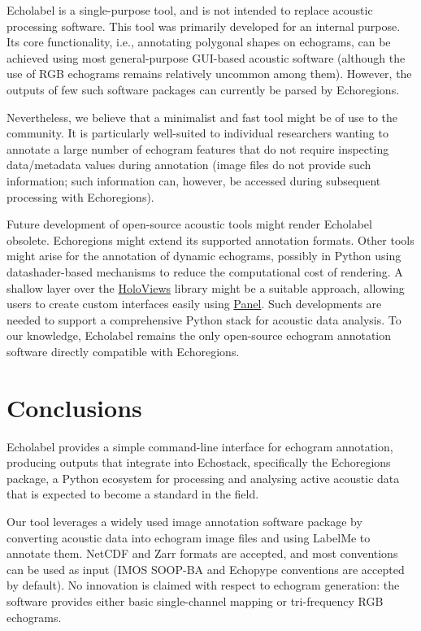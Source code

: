 \documentclass[
  number,
  preprint,
  3p]{elsarticle}
\begin{document}
Echolabel is a single-purpose tool, and is not intended to replace
acoustic processing software. This tool was primarily developed for an
internal purpose. Its core functionality, i.e., annotating polygonal
shapes on echograms, can be achieved using most general-purpose
GUI-based acoustic software (although the use of RGB echograms remains
relatively uncommon among them). However, the outputs of few such
software packages can currently be parsed by Echoregions.

Nevertheless, we believe that a minimalist and fast tool might be of use
to the community. It is particularly well-suited to individual
researchers wanting to annotate a large number of echogram features that
do not require inspecting data/metadata values during annotation (image
files do not provide such information; such information can, however, be
accessed during subsequent processing with Echoregions).

Future development of open-source acoustic tools might render Echolabel
obsolete. Echoregions might extend its supported annotation formats.
Other tools might arise for the annotation of dynamic echograms,
possibly in Python using datashader-based mechanisms to reduce the
computational cost of rendering. A shallow layer over the
\href{https://holoviews.org/}{HoloViews} library might be a suitable
approach, allowing users to create custom interfaces easily using
\href{https://panel.holoviz.org/}{Panel}. Such developments are needed
to support a comprehensive Python stack for acoustic data analysis. To
our knowledge, Echolabel remains the only open-source echogram
annotation software directly compatible with Echoregions.

\section{Conclusions}\label{conclusions}

Echolabel provides a simple command-line interface for echogram
annotation, producing outputs that integrate into Echostack,
specifically the Echoregions package, a Python ecosystem for processing
and analysing active acoustic data that is expected to become a standard
in the field.

Our tool leverages a widely used image annotation software package by
converting acoustic data into echogram image files and using LabelMe to
annotate them. NetCDF and Zarr formats are accepted, and most
conventions can be used as input (IMOS SOOP-BA and Echopype conventions
are accepted by default). No innovation is claimed with respect to
echogram generation: the software provides either basic single-channel
mapping or tri-frequency RGB echograms.
\end{document}
